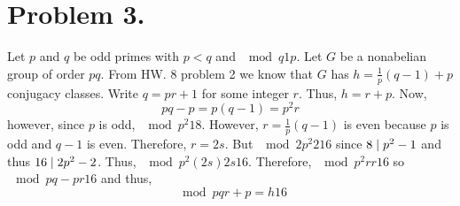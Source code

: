 \documentclass[12pt]{extarticle}
\begin{document}
\section*{Problem 3.}

Let $p$ and $q$ be odd primes with $p < q$ and $\mod{q}{1}{p}$. Let $G$ be a nonabelian group of order $pq$. From HW. 8 problem 2 we know that $G$ has $h = \tfrac{1}{p}(q - 1) + p$ conjugacy classes. Write $q = pr + 1$ for some integer $r$. Thus, $h = r + p$. Now,
\[ pq - p = p(q-1) = p^2 r \]
however, since $p$ is odd, $\mod{p^2}{1}{8}$. However, $r = \tfrac{1}{p} ( q - 1 )$ is even because $p$ is odd and $q - 1$ is even. Therefore, $r = 2 s$. But $\mod{2 p^2}{2}{16}$ since $8 \mid p^2 - 1$ and thus $16 \mid 2 p^2 - 2$. Thus, $\mod{p^2 (2s)}{2s}{16}$. Therefore, $\mod{p^2 r}{r}{16}$ so $\mod{pq - p}{r}{16}$ and thus,
\[ \mod{pq}{r + p = h}{16} \]
\end{document}
